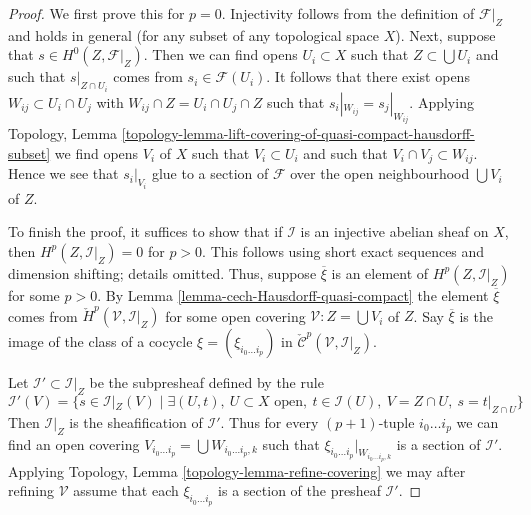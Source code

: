 \begin{proof}
We first prove this for $p = 0$. Injectivity follows from
the definition of $\mathcal{F}|_Z$ and holds in general
(for any subset of any topological space $X$). Next, suppose that
$s \in H^0(Z, \mathcal{F}|_Z)$. Then we can find opens $U_i \subset X$
such that $Z \subset \bigcup U_i$ and such that $s|_{Z \cap U_i}$
comes from $s_i \in \mathcal{F}(U_i)$. It follows that
there exist opens $W_{ij} \subset U_i \cap U_j$ with
$W_{ij} \cap Z = U_i \cap U_j \cap Z$ such that
$s_i|_{W_{ij}} = s_j|_{W_{ij}}$. Applying
Topology, Lemma
\ref{topology-lemma-lift-covering-of-quasi-compact-hausdorff-subset}
we find opens $V_i$ of $X$ such that $V_i \subset U_i$ and
such that $V_i \cap V_j \subset W_{ij}$. Hence we see that
$s_i|_{V_i}$ glue to a section of $\mathcal{F}$ over the
open neighbourhood $\bigcup V_i$ of $Z$.

\medskip\noindent
To finish the proof, it suffices to show that if $\mathcal{I}$ is an
injective abelian sheaf on $X$, then $H^p(Z, \mathcal{I}|_Z) = 0$
for $p > 0$. This follows using short exact sequences and dimension
shifting; details omitted. Thus, suppose $\overline{\xi}$ is an element
of $H^p(Z, \mathcal{I}|_Z)$ for some $p > 0$.
By Lemma \ref{lemma-cech-Hausdorff-quasi-compact}
the element $\overline{\xi}$ comes from
$\check{H}^p(\mathcal{V}, \mathcal{I}|_Z)$
for some open covering $\mathcal{V} : Z = \bigcup V_i$ of $Z$.
Say $\overline{\xi}$ is the image of the class of a cocycle
$\xi = (\xi_{i_0 \ldots i_p})$ in
$\check{\mathcal{C}}^p(\mathcal{V}, \mathcal{I}|_Z)$.

\medskip\noindent
Let $\mathcal{I}' \subset \mathcal{I}|_Z$ be the subpresheaf
defined by the rule
$$
\mathcal{I}'(V) =
\{s \in \mathcal{I}|_Z(V) \mid
\exists (U, t),\ U \subset X\text{ open},
\ t \in \mathcal{I}(U),\ V = Z \cap U,\ s = t|_{Z \cap U} \}
$$
Then $\mathcal{I}|_Z$ is the sheafification of $\mathcal{I}'$.
Thus for every $(p + 1)$-tuple $i_0 \ldots i_p$ we can find an
open covering $V_{i_0 \ldots i_p} = \bigcup W_{i_0 \ldots i_p, k}$
such that $\xi_{i_0 \ldots i_p}|_{W_{i_0 \ldots i_p, k}}$ is
a section of $\mathcal{I}'$. Applying
Topology, Lemma \ref{topology-lemma-refine-covering}
we may after refining $\mathcal{V}$ assume that each
$\xi_{i_0 \ldots i_p}$ is a section of the presheaf $\mathcal{I}'$.


\end{proof}
